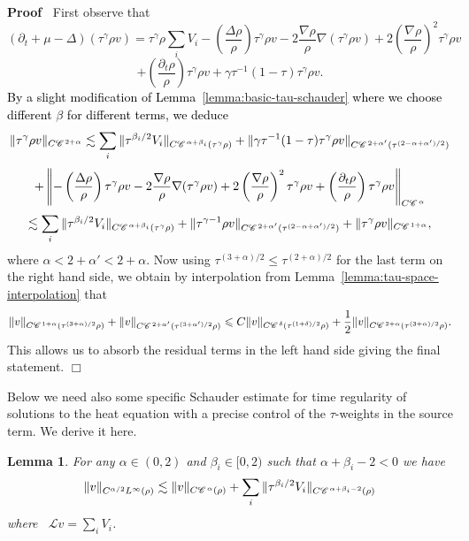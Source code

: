 \documentclass[a4paper,11pt]{article}
\renewcommand{\leq}{\leqslant}
\newenvironment{proof}{\noindent\textbf{Proof\ }}{\hspace*{\fill}$\Box$\medskip}
\newtheorem{lemma}[theorem]{Lemma}
\numberwithin{equation}{section}
\newcommand{\CC}{\mathscr{C} \hspace{.1em}}
\newcommand{\LL}{\mathscr{L}}
\newcommand{\rmbb}[1]{\textcolor{black}{#1}}
\newcommand{\8}{\infty}
\begin{document}
\begin{proof}
First observe that
  \[ (\partial_t + \mu - \Delta) (\tau^{\gamma} \rho v) = \tau^{\gamma} \rho \sum_i V_i
     - \left( \frac{\Delta \rho}{\rho} \right) \tau^{\gamma} \rho v - 2
     \frac{\nabla \rho}{\rho} \nabla (\tau^{\gamma} \rho v) + 2 \left(
     \frac{\nabla \rho}{\rho} \right)^2 \tau^{\gamma} \rho v  \]
  \[ + \left(
     \frac{\partial_t \rho}{\rho} \right) \tau^{\gamma} \rho v+ \gamma \tau^{- 1} (1 - \tau) \tau^{\gamma} \rho v. \]
\rmbb{  By a slight modification of Lemma~\ref{lemma:basic-tau-schauder} where we choose different $\beta$ for different terms, we deduce
  $$
  \| \tau^{\gamma} \rho v \|_{C \CC^{2 + \alpha}}\lesssim \sum_i \| \tau^{\beta_i /
     2} V_i \|_{C \CC^{\alpha + \beta_i} (\tau^{\gamma} \rho)} + \| \gamma \tau^{- 1} (1 - \tau) \tau^{\gamma} \rho v
     \|_{C \CC^{2 +
     \alpha'} (\tau^{(2 - \alpha + \alpha') / 2})}
 $$
 $$  
 + \left\| -\left( \frac{\Delta \rho}{\rho} \right) \tau^{\gamma} \rho v - 2
     \frac{\nabla \rho}{\rho} \nabla (\tau^{\gamma} \rho v) + 2 \left(
     \frac{\nabla \rho}{\rho} \right)^2 \tau^{\gamma} \rho v +\left(
     \frac{\partial_t \rho}{\rho} \right) \tau^{\gamma} \rho v \right\|_{C \CC^{ \alpha}} 
  $$}
  \[  \lesssim  \sum_i \| \tau^{\beta_i /
     2} V_i \|_{C \CC^{\alpha + \beta_i} (\tau^{\gamma} \rho)} + \| \tau^{\gamma - 1} \rho v \|_{C \CC^{2 +
     \alpha'} (\tau^{(2 - \alpha + \alpha') / 2})} + \| \tau^{\gamma} \rho v
     \|_{C \CC^{1 + \alpha}}, \]
  where $\alpha < 2 + \alpha' < 2 + \alpha$. Now using  $\tau^{(3+\alpha)/2}\leq \tau^{(2+\alpha)/2}$ for the last term on the right hand side, we obtain by interpolation from
  Lemma~\ref{lemma:tau-space-interpolation} that 
  \[ \| v \|_{C \CC^{1 + \alpha} (\tau^{(3 + \alpha) / 2} \rho)} + \| v \|_{C
     \CC^{2 + \alpha'} (\tau^{(3 + \alpha') / 2} \rho)} \leqslant C \| v \|_{C
     \CC^{\delta} (\tau^{(1 + \delta) / 2} \rho)} + \frac{1}{2} \| v \|_{C
     \CC^{2 + \alpha} (\tau^{(3 + \alpha) / 2} \rho)} . \]
  This allows us to absorb the residual terms in the left hand side giving the
  final statement.
\end{proof}

Below we need also some specific Schauder estimate for time regularity of
solutions to the heat equation with a precise control of the $\tau$-weights in
the source term. We derive it here.

\begin{lemma}
  \label{lemma:time-tau-schauder}For any $\alpha \in (0, 2)$ and $\beta_i \in
  [0, 2)$ such that $\alpha + \beta_i - 2 < 0$ we have
  \[ \| v \|_{C^{\alpha / 2} L^{\infty} (\rho)} \lesssim \| v \|_{C
     \CC^{\alpha} (\rho)} + \sum_i \| \tau^{\beta_i / 2} V_i \|_{C \CC^{\alpha
     + \beta_i - 2} (\rho)} \]
  where \ $\LL v = \sum_i V_i$.
\end{lemma}
\end{document}
